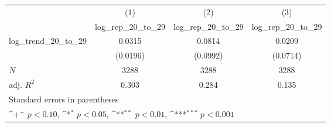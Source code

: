 {
\def\sym#1{\ifmmode^{#1}\else\(^{#1}\)\fi}
\begin{tabular}{l*{3}{c}}
\hline\hline
            &\multicolumn{1}{c}{(1)}&\multicolumn{1}{c}{(2)}&\multicolumn{1}{c}{(3)}\\
            &\multicolumn{1}{c}{log\_rep\_20\_to\_29}&\multicolumn{1}{c}{log\_rep\_20\_to\_29}&\multicolumn{1}{c}{log\_rep\_20\_to\_29}\\
\hline
log\_trend\_20\_to\_29&      0.0315         &      0.0814         &      0.0209         \\
            &    (0.0196)         &    (0.0992)         &    (0.0714)         \\
\hline
\(N\)       &        3288         &        3288         &        3288         \\
adj. \(R^{2}\)&       0.303         &       0.284         &       0.135         \\
\hline\hline
\multicolumn{4}{l}{\footnotesize Standard errors in parentheses}\\
\multicolumn{4}{l}{\footnotesize \sym{+} \(p<0.10\), \sym{*} \(p<0.05\), \sym{**} \(p<0.01\), \sym{***} \(p<0.001\)}\\
\end{tabular}
}

